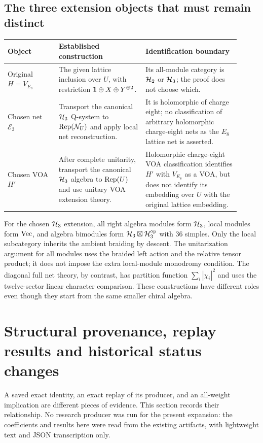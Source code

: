 \subsection{The three extension objects that must remain distinct}

\begin{longtable}{@{}p{0.2\linewidth}p{0.34\linewidth}p{0.37\linewidth}@{}}
\toprule
Object&Established construction&Identification boundary\\
\midrule\endhead
Original $H=V_{E_8}$&The given lattice inclusion over $U$, with
restriction $\one\oplus X\oplus Y^{\oplus2}$.&Its all-module
category is $\HH_2$ or $\HH_3$; the proof does not choose which.\\
Chosen net $\mathcal E_3$&Transport the canonical $\HH_3$ Q-system
to $\Rep(\mathcal N_U)$ and apply local net reconstruction.&It is
holomorphic of charge eight; no classification of arbitrary
holomorphic charge-eight nets as the $E_8$ lattice net is asserted.\\
Chosen VOA $H'$&After complete unitarity, transport the canonical
$\HH_3$ algebra to $\Rep(U)$ and use unitary VOA extension theory.&
Holomorphic charge-eight VOA classification identifies $H'$ with
$V_{E_8}$ as a VOA, but does not identify its embedding over $U$
with the original lattice embedding.\\
\bottomrule
\end{longtable}

For the chosen $\HH_3$ extension, all right algebra modules form
$\HH_3$, local modules form $\Vec$, and algebra bimodules form
$\HH_3\boxtimes\HH_3^{\rm op}$ with $36$ simples. Only the local
subcategory inherits the ambient braiding by descent. The
unitarization argument for all modules uses the braided left
action and the relative tensor product; it does not impose the
extra local-module monodromy condition. The diagonal full net
theory, by contrast, has partition function
$\sum_i|\chi_i|^2$ and uses the twelve-sector linear character
comparison. These constructions have different roles even though
they start from the same smaller chiral algebra.

\section{Structural provenance, replay results and historical status changes}
\label{expstructure:provenance}

A saved exact identity, an exact replay of its producer, and an
all-weight implication are different pieces of evidence. This
section records their relationship. No research producer was run
for the present expansion: the coefficients and results here were
read from the existing artifacts, with lightweight text and JSON
transcription only.

